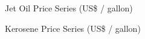 \documentclass[a4paper,10pt]{article}
\begin{document}
\begin{figure}[!h]
    \centering
	\noindent{}
	\caption[Oil Price]{Jet Oil Price Series (US\$ / gallon)}
    \label{fig:oilprice6}
\end{figure}

\begin{figure}[!h]
    \centering
	\noindent{}
	\caption[Oil Price]{Kerosene Price Series (US\$ / gallon)}
    \label{fig:oilprice7}
\end{figure}
\end{document}
